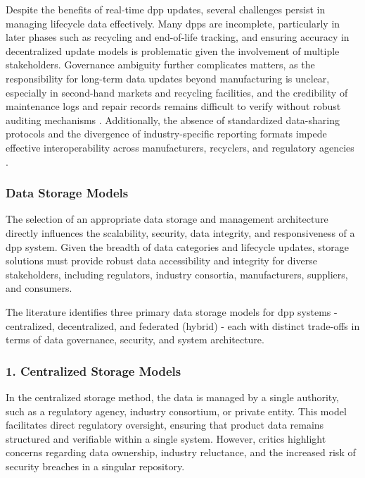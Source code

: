 Despite the benefits of real-time \ac{dpp} updates, several challenges persist in managing lifecycle data effectively. Many \ac{dpp}s are incomplete, particularly in later phases such as recycling and end-of-life tracking, and ensuring accuracy in decentralized update models is problematic given the involvement of multiple stakeholders. Governance ambiguity further complicates matters, as the responsibility for long-term data updates beyond manufacturing is unclear, especially in second-hand markets and recycling facilities, and the credibility of maintenance logs and repair records remains difficult to verify without robust auditing mechanisms \autocite{Ducuing.2023}. Additionally, the absence of standardized data-sharing protocols and the divergence of industry-specific reporting formats impede effective interoperability across manufacturers, recyclers, and regulatory agencies \autocite{Plociennik.2023}.

\subsubsection*{Data Storage Models}
The selection of an appropriate data storage and management architecture directly influences the scalability, security, data integrity, and responsiveness of a \ac{dpp} system. Given the breadth of data categories and lifecycle updates, storage solutions must provide robust data accessibility and integrity for diverse stakeholders, including regulators, industry consortia, manufacturers, suppliers, and consumers. \autocite{Pietron.2023}

The literature identifies three primary data storage models for \ac{dpp} systems - centralized, decentralized, and federated (hybrid) - each with distinct trade-offs in terms of data governance, security, and system architecture.

\subsubsection*{1. Centralized Storage Models}
In the centralized storage method, the data is managed by a single authority, such as a regulatory agency, industry consortium, or private entity. This model facilitates direct regulatory oversight, ensuring that product data remains structured and verifiable within a single system. However, critics highlight concerns regarding data ownership, industry reluctance, and the increased risk of security breaches in a singular repository. \autocite{Pietron.2023}

